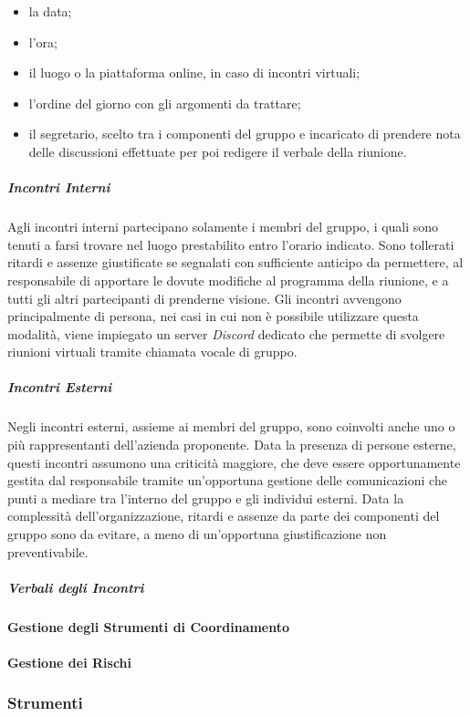 			\begin{itemize}
				\item la data;
				\item l'ora;
				\item il luogo o la piattaforma online, in caso di incontri virtuali;
				\item l'ordine del giorno con gli argomenti da trattare;
				\item il segretario, scelto tra i componenti del gruppo e incaricato di prendere nota delle discussioni effettuate per poi redigere il verbale della riunione.
			\end{itemize}
		
			\subparagraph{Incontri Interni}
			
				Agli incontri interni partecipano solamente i membri del gruppo, i quali sono tenuti a farsi trovare nel luogo prestabilito entro l'orario indicato.
				\newline
				Sono tollerati ritardi e assenze giustificate se segnalati con sufficiente anticipo da permettere, al responsabile di apportare le dovute modifiche al programma della riunione, e a tutti gli altri partecipanti di prenderne visione.
				\newline
				Gli incontri avvengono principalmente di persona, nei casi in cui non è possibile utilizzare questa modalità, viene impiegato un server \textit{Discord} dedicato che permette di svolgere riunioni virtuali tramite chiamata vocale di gruppo.
			
			\subparagraph{Incontri Esterni}
			
				Negli incontri esterni, assieme ai membri del gruppo, sono coinvolti anche uno o più rappresentanti dell'azienda proponente.
				\newline
				Data la presenza di persone esterne, questi incontri assumono una criticità maggiore, che deve essere opportunamente gestita dal responsabile tramite un'opportuna gestione delle comunicazioni che punti a mediare tra l'interno del gruppo e gli individui esterni.
				\newline
				Data la complessità dell'organizzazione, ritardi e assenze da parte dei componenti del gruppo sono da evitare, a meno di un'opportuna giustificazione non preventivabile.
			
			\subparagraph{Verbali degli Incontri}
		
		\paragraph{Gestione degli Strumenti di Coordinamento}
		
		\paragraph{Gestione dei Rischi}
	
	\subsubsection{Strumenti}